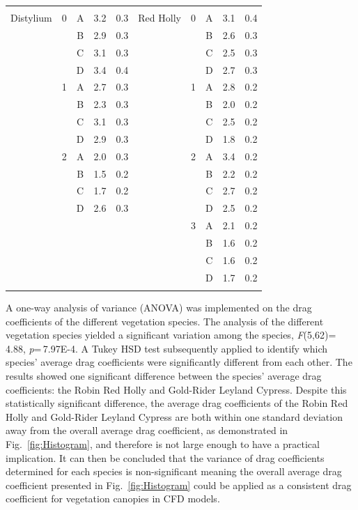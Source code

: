 \documentclass[12pt]{article}
\begin{document}
\begin{table}
\begin{tabular}{cccccccccc}
					&		&		& 		&					&				&		&		& 		&		\\
Distylium			&	0	&	A	& 	3.2	&	0.3				&Red Holly		&	0	&	A	& 	3.1	&	0.4	\\
					&		&	B	& 	2.9	&	0.3				&				&		&	B	& 	2.6	&	0.3	\\
					&		&	C	& 	3.1	&	0.3				&				&		&	C	& 	2.5	&	0.3	\\
					&		&	D	& 	3.4	&	0.4				&				&		&	D	& 	2.7	&	0.3	\\
					&	1	&	A	& 	2.7	&	0.3				&				&	1	&	A	& 	2.8	&	0.2	\\
					&		&	B	& 	2.3	&	0.3				&				&		&	B	& 	2.0	&	0.2	\\
					&		&	C	& 	3.1	&	0.3				&				&		&	C	& 	2.5	&	0.2	\\
					&		&	D	& 	2.9	&	0.3				&				&		&	D	& 	1.8	&	0.2	\\
					&	2	&	A	& 	2.0	&	0.3				&				&	2	&	A	& 	3.4	&	0.2	\\
					&		&	B	& 	1.5	&	0.2				&				&		&	B	& 	2.2	&	0.2	\\
					&		&	C	& 	1.7	&	0.2				&				&		&	C	& 	2.7	&	0.2	\\
					&		&	D	& 	2.6	&	0.3				&				&		&	D	& 	2.5	&	0.2	\\
					&		&		& 		&					&				&	3	&	A	& 	2.1	&	0.2	\\
					&		&		& 		&					&				&		&	B	& 	1.6	&	0.2	\\
					&		&		& 		&					&				&		&	C	& 	1.6	&	0.2	\\
					&		&		& 		&					&				&		&	D	& 	1.7	&	0.2	\\
\\[0.05cm]
\hline														

\end{tabular}
\end{table}

A one-way analysis of variance (ANOVA) was implemented on the drag coefficients of the different vegetation species. The analysis of the different vegetation species yielded a significant variation among the species, \textit{F}(5,62)=\,4.88, \textit{p}=\,7.97E-4. A Tukey HSD test subsequently applied to identify which species' average drag coefficients were significantly different from each other. The results showed one significant difference between the species' average drag coefficients: the Robin Red Holly and Gold-Rider Leyland Cypress. Despite this statistically significant difference, the average drag coefficients of the Robin Red Holly and Gold-Rider Leyland Cypress are both within one standard deviation away from the overall average drag coefficient, as demonstrated in Fig.~\ref{fig:Histogram},  and therefore is not large enough to have a practical implication. It can then be concluded that the variance of drag coefficients determined for each species is non-significant meaning the overall average drag coefficient presented in Fig.~\ref{fig:Histogram} could be applied as a consistent drag coefficient for vegetation canopies in CFD models.
\end{document}
